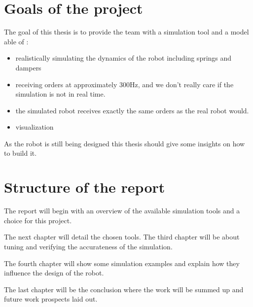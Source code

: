 \section{Goals of the project}
The goal of this thesis is to provide the team with a simulation tool and a model able of :
\begin{itemize}
\item realistically simulating the dynamics of the robot including springs and dampers
\item receiving orders at approximately 300Hz, and we don't really care if the simulation is not in real time.
\item the simulated robot receives exactly the same orders as the real robot would.
\item visualization
\end{itemize}
As the robot is still being designed this thesis should give some insights on how to build it.

\section{Structure of the report}
The report will begin with an overview of the available simulation tools and a choice for this project.

The next chapter will detail the chosen tools. The third chapter will be about tuning and verifying the accurateness of the simulation.

The fourth chapter will show some simulation examples and explain how they influence the design of the robot.

The last chapter will be the conclusion where the work will be summed up and future work prospects laid out.